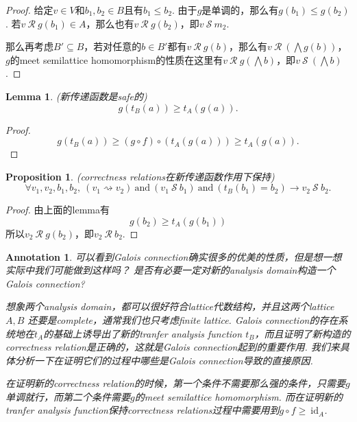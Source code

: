 \documentclass{article}
\newtheorem{lemma}[theorem]{Lemma}
\newtheorem{proposition}[theorem]{Proposition}
\newtheorem{annotation}[theorem]{Annotation}
\begin{document}
\begin{proof}
给定$v \in V$和$b_1,b_2 \in B$且有$b_1 \leq b_2$. 由于$g$是单调的，那么有$g(b_1) \leq g(b_2)$. 若$v~\mathcal{R}~g(b_1) \in A$，那么也有$v~\mathcal{R}~g(b_2)$，即$v~\mathcal{S}~m_2$.

那么再考虑$B' \subseteq B$，若对任意的$b \in B'$都有$v~\mathcal{R}~g(b)$，那么有$v ~\mathcal{R}~(\bigwedge g(b))$，$g$的meet semilattice homomorphism的性质在这里有$v~\mathcal{R}~g(\bigwedge b)$，即$v~\mathcal{S}~(\bigwedge b)$.
\end{proof}

\begin{lemma} \rm {\color{red}(新传递函数是safe的)}
$$
g(t_B(a)) \geq t_A(g(a)).
$$
\end{lemma}

\begin{proof}
$$
g(t_B(a)) \geq (g \circ f)\circ (t_A(g(a))) \geq t_A(g(a)).
$$
\end{proof}

\begin{proposition}
\rm {\color{red}(correctness relations在新传递函数作用下保持)}
$$
\forall v_1,v_2,b_1,b_2,~(v_1 \rightsquigarrow v_2)~\text{and}~(v_1 ~\mathcal{S}~b_1)~\text{and}~(t_B(b_1) = b_2) \rightarrow v_2~\mathcal{S}~ b_2.
$$
\end{proposition}

\begin{proof}
由上面的lemma有
$$
g(b_2) \geq t_A(g(b_1))
$$
所以$v_2~\mathcal{R}~g(b_2)$，即$v_2~\mathcal{R}~b_2$.
\end{proof}

\begin{annotation}
\rm 可以看到Galois connection确实很多的优美的性质，但是想一想实际中我们可能做到这样吗？ 是否有必要一定对新的analysis domain构造一个Galois connection?

想象两个analysis domain，都可以很好符合lattice代数结构，并且这两个lattice $A,B$ 还要是complete，通常我们也只考虑finite lattice. Galois connection的存在系统地在$t_A$的基础上诱导出了新的tranfer analysis function $t_B$，而且证明了新构造的correctness relation是正确的，这就是Galois connection起到的重要作用. 我们来具体分析一下在证明它们的过程中哪些是Galois connection导致的直接原因. 

在证明新的correctness relation的时候，第一个条件不需要那么强的条件，只需要$g$单调就行，而第二个条件需要$g$的meet semilattice homomorphism. 而在证明新的tranfer analysis function保持correctness relations过程中需要用到$g \circ f \geq~\text{id}_A$.
\end{annotation}
\end{document}

